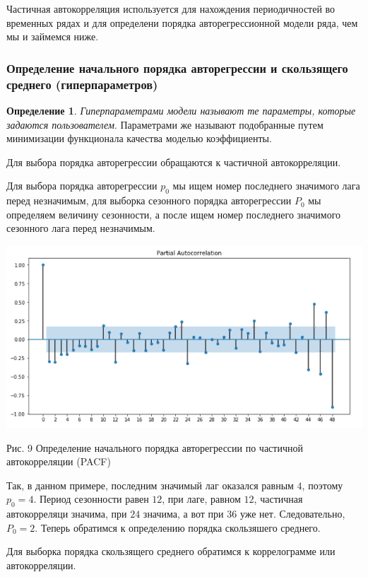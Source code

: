 \documentclass[aps,%
12pt,%
final,%
oneside,
onecolumn,%
musixtex, %
superscriptaddress,%
centertags]{article} %
\theoremstyle{plain}
\theoremstyle{definition}
\newtheorem{definition}{Определение}[subsection]
\theoremstyle{remark}
\begin{document}
Частичная автокорреляция используется для нахождения периодичностей во временных рядах и для определени порядка авторегрессионной модели ряда, чем мы и займемся ниже.


\subsubsection{Определение начального порядка авторегрессии и скользящего среднего (гиперпараметров)}

\begin{definition}
	\textit{Гиперпараметрами модели называют те параметры, которые задаются пользователем}. Параметрами же называют подобранные путем минимизации функционала качества моделью коэффициенты.
\end{definition}

Для выбора порядка авторегрессии обращаются к частичной автокорреляции.

Для выбора порядка авторегрессии $p_0$ мы ищем номер последнего значимого лага перед незначимым, для выборка сезонного порядка авторегрессии $P_0$ мы определяем величину сезонности, а после ищем номер последнего значимого сезонного лага перед незначимым.

\begin{center}
	\includegraphics[scale=0.5]{images/9.png}

	Рис. 9 Определение начального порядка авторегрессии по частичной автокорреляции (PACF)
\end{center}

Так, в данном примере, последним значимый лаг оказался равным $4$, поэтому $p_0=4$. Период сезонности равен $12$, при лаге, равном $12$, частичная автокорреляци значима, при $24$ значима, а вот при $36$ уже нет. Следовательно, $P_0=2$. Теперь обратимся к определению порядка скользяшего среднего.

Для выборка порядка скользящего среднего обратимся к коррелограмме или автокорреляции.
\end{document}
